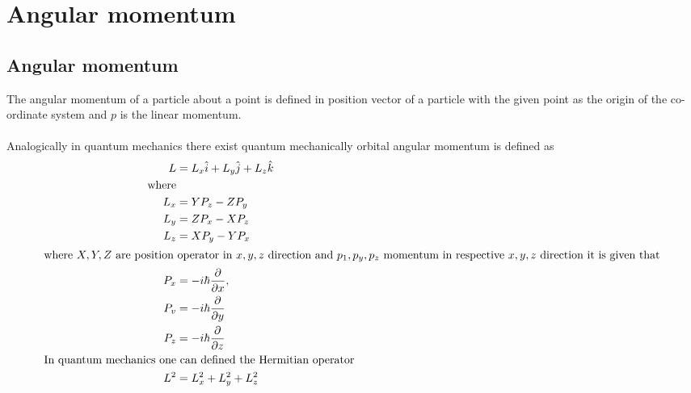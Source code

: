 \chapter{Angular momentum}
\section{Angular momentum }
The angular momentum of a particle about a point is defined in position vector of a particle with the given point as the origin of the co-ordinate system and $p$ is the linear momentum.\\\\
Analogically in quantum mechanics there exist quantum mechanically orbital angular momentum is defined as
\begin{align*}
L&=L_{x} \hat{i}+L_{y} \hat{j}+L_{z} \hat{k}\\
\text{where}&\\
L_{x}&=Y P_{z}-Z P_{y}\\
L_{y}&=Z P_{x}-X P_{z}\\
L_{z}&=X P_{y}-Y P_{x}\\
\intertext{where $X, Y, Z$ are position operator in $x, y, z$ direction and $p_{1}, p_{y}, p_{z}$ momentum in respective
	$x, y, z$ direction it is given that }
P_{x}&=-i \hbar \frac{\partial}{\partial x},\\
 P_{v}&=-i \hbar \frac{\partial}{\partial y}\\
P_{z}&=-i \hbar \frac{\partial}{\partial z}\\
\text{In quantum mechanics one}&\text{ can defined the Hermitian operator}\\
L^{2}&=L_{x}^{2}+L_{y}^{2}+L_{z}^{2}
\end{align*}
